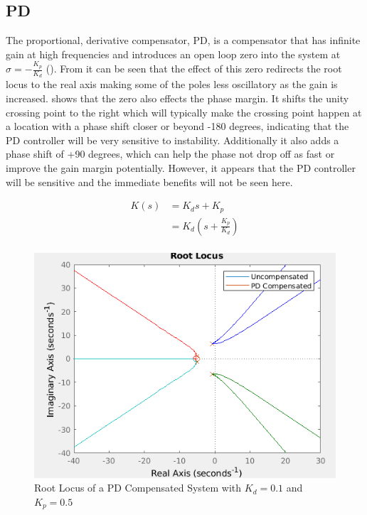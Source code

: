 \documentclass[a4paper, 11pt, compsoc]{IEEEtran}
\begin{document}
		\subsection{PD}\label{sec:pd}
			The proportional, derivative compensator, PD, is a compensator that has infinite gain at high frequencies and introduces an open loop zero into the system at $\sigma = -\frac{K_p}{K_d}$ (). From  it can be seen that the effect of this zero redirects the root locus to the real axis making some of the poles less oscillatory as the gain is increased.  shows that the zero also effects the phase margin. It shifts the unity crossing point to the right which will typically make the crossing point happen at a location with a phase shift closer or beyond -180 degrees, indicating that the PD controller will be very sensitive to instability. Additionally it also adds a phase shift of +90 degrees, which can help the phase not drop off as fast or improve the gain margin potentially. However, it appears that the PD controller will be sensitive and the immediate benefits will not be seen here.
			\par
			\begin{equation}
				\label{eq:pdeq}
				\begin{split}
					K(s) & = K_ds + K_p\\
						 & = K_d(s + \frac{K_p}{K_d})\\
				\end{split}
			\end{equation}
			\begin{figure}[!ht]
				\centering
				\includegraphics[width=\columnwidth]{lab6PDrl.png}
				\caption{Root Locus of a PD Compensated System with $K_d = 0.1$ and $K_p = 0.5$}
				\label{fig:lab6PDrl}
			\end{figure}
\end{document}
